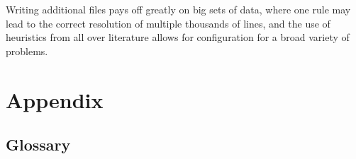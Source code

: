 \documentclass[11pt]{article}
\begin{document}
Writing additional files pays off greatly on big sets of data, where one rule may lead to the correct resolution of multiple thousands of lines, and the use of heuristics from all over literature allows for configuration for a broad variety of problems.

\newpage
\section{Appendix}

\subsection{Glossary}
\end{document}
